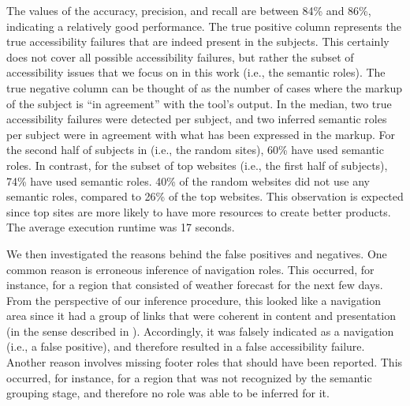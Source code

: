 The values of the accuracy, precision, and recall 
are between 84\% and 86\%, indicating a relatively good 
performance. The true positive column represents the 
true accessibility failures that are indeed present in the subjects. 
This certainly does not cover all possible accessibility failures, 
but rather the subset of accessibility issues that we focus on in this 
work (i.e., the semantic roles).
The true negative column can be thought of as the number of cases 
where the markup of the subject is ``in agreement'' 
with the tool's output.  
In the median, two true accessibility failures were detected per subject, 
and two inferred semantic roles per subject were in agreement with what has been 
expressed in the markup. 
For the second half of subjects in  (i.e., the random sites), 
60\% have used semantic roles. In contrast, for the subset of top websites 
(i.e., the first half of subjects), 
74\% have used semantic roles.
40\% of the random websites did not use any semantic roles, compared 
to 26\% of the top websites.    
This observation is expected since top sites are more likely 
to have more resources to create better products. 
The average execution runtime was 17 seconds.

We then investigated the reasons behind the false positives and negatives. 
One common reason is erroneous inference of navigation roles. 
This occurred, for instance, for a region that consisted of weather forecast 
for the next few days. From the perspective of our inference procedure, 
this looked like a navigation area since it had a group of links that were 
coherent in content and presentation (in the sense described in ).
Accordingly, it was falsely indicated as a navigation (i.e., a false positive), and therefore resulted 
in a false accessibility failure. Another reason involves missing footer roles 
that should have been reported. This occurred, for instance, 
for a region that was not recognized by the semantic grouping stage, and therefore 
no role was able to be inferred for it.

